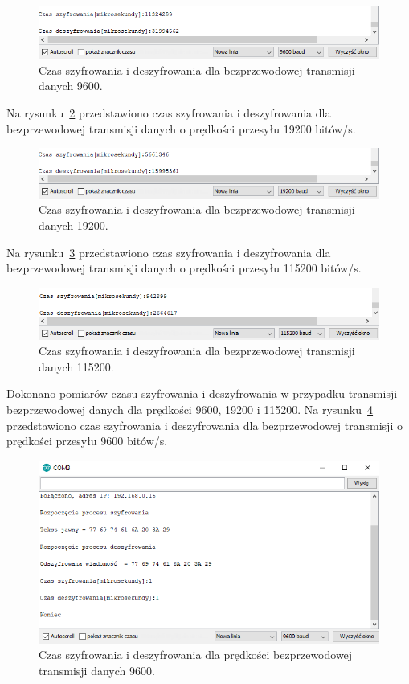 \documentclass[12p]{article}
\begin{document}
\begin{figure}[H]
\centering
\includegraphics[width=12cm]{9600_wifi_print.png}
\caption{Czas szyfrowania i deszyfrowania dla bezprzewodowej transmisji danych 9600.}\label{9600_wifi_print}
\end{figure}

Na rysunku~\ref{19200_wifi_print} przedstawiono czas szyfrowania i deszyfrowania dla bezprzewodowej transmisji danych o prędkości przesyłu 19200 bitów/s.

\begin{figure}[H]
\centering
\includegraphics[width=12cm]{19200_wifi_print.png}
\caption{Czas szyfrowania i deszyfrowania dla bezprzewodowej transmisji danych 19200.}\label{19200_wifi_print}
\end{figure}

\newpage
Na rysunku~\ref{115200_wifi_print} przedstawiono czas szyfrowania i deszyfrowania dla bezprzewodowej transmisji danych o prędkości przesyłu 115200 bitów/s.

\begin{figure}[H]
\centering
\includegraphics[width=12cm]{115200_wifi_print.png}
\caption{Czas szyfrowania i deszyfrowania dla bezprzewodowej transmisji danych 115200.}\label{115200_wifi_print}
\end{figure}


Dokonano pomiarów czasu szyfrowania i deszyfrowania w przypadku transmisji bezprzewodowej danych dla prędkości 9600, 19200 i 115200. Na rysunku~\ref{9600_wifi} przedstawiono czas szyfrowania i deszyfrowania dla bezprzewodowej transmisji o prędkości przesyłu 9600 bitów/s.

\begin{figure}[H]
\centering
\includegraphics[width=12cm]{9600_wifi.png}
\caption{Czas szyfrowania i deszyfrowania dla prędkości bezprzewodowej transmisji danych 9600.}\label{9600_wifi}
\end{figure}
\end{document}
